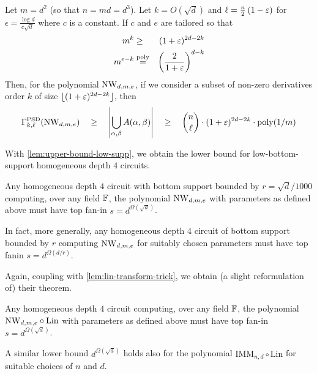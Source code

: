 \begin{lemma}
Let $m = d^2$ (so that $n = md = d^3$). Let $k = O(\sqrt{d})$ and  $\ell  = \frac{n}{2}\left(1 - \varepsilon\right)$ for $\epsilon = \frac{\log d}{c \sqrt{d}}$ where $c$ is a constant. If $c$ and $e$ are tailored so that 
\begin{eqnarray*}
 m^k & \geq &  (1+\varepsilon)^{2d - 2k}\\
 m^{e-k} &\stackrel{\mathrm{poly}}{=} & \left(\frac{2}{1+\varepsilon}\right)^{d-k}
\end{eqnarray*}
Then, for the polynomial $\mathrm{NW}_{d,m,e}$, if we consider a subset of non-zero derivatives order $k$ of size $\lfloor (1+\varepsilon)^{2d - 2k} \rfloor$, then
\[
\Gamma^{\mathrm{PSD}}_{k,\ell}(\mathrm{NW}_{d,m,e})\quad \geq \quad\left|\bigcup_{\alpha, \beta} A(\alpha, \beta)\right| \quad \geq \quad \binom{n}{\ell} \cdot (1+\varepsilon)^{2d-2k} \cdot \mathrm{poly}(1/m)
\] 
\end{lemma}

With \autoref{lem:upper-bound-low-supp}, we obtain the lower bound for low-bottom-support homogeneous depth $4$ circuits. 

\begin{theorem}[\cite{KS14}]\label{thm:IMM-lowsup-lb}
Any homogeneous depth $4$ circuit with bottom support bounded by $r = \sqrt{d}/1000$ computing, over any field $\mathbb{F}$, the polynomial $\mathrm{NW}_{d,m,e}$ with parameters as defined above must have top fan-in $s = d^{\Omega(\sqrt{d})}$. 

In fact, more generally, any homogeneous depth $4$ circuit of bottom support bounded by $r$ computing $\mathrm{NW}_{d,m,e}$ for suitably chosen parameters must have top fanin $s = d^{\Omega(d/r)}$. 
\end{theorem}

Again, coupling with \autoref{lem:lin-transform-trick}, we obtain (a slight reformulation of) their theorem. 

\begin{theorem}\label{thm:IMM-lb}
Any homogeneous depth $4$ circuit computing, over any field $\mathbb{F}$,  the polynomial $\mathrm{NW}_{d,m,e}\circ \mathrm{Lin}$ with parameters as defined above must have top fan-in $s = d^{\Omega(\sqrt{d})}$. 

A similar lower bound $d^{\Omega(\sqrt{d})}$ holds also for the polynomial $\mathrm{IMM}_{n,d} \circ \mathrm{Lin}$ for suitable choices of $n$ and $d$. 
\end{theorem}



